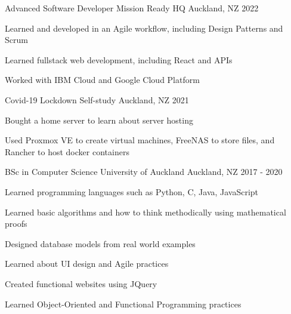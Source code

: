 

\begin{cventries}

  \cventry
    {Advanced Software Developer}
    {Mission Ready HQ}
    {Auckland, NZ}
    {2022}
    {
      \begin{cvitems}
        \item {Learned and developed in an Agile workflow, including Design Patterns and Scrum}
        \item {Learned fullstack web development, including React and APIs}
        \item {Worked with IBM Cloud and Google Cloud Platform}
      \end{cvitems}
    }

  \cventry
    {Covid-19 Lockdown}
    {Self-study}
    {Auckland, NZ}
    {2021}
    {
      \begin{cvitems}
        \item {Bought a home server to learn about server hosting}
        \item {Used Proxmox VE to create virtual machines, FreeNAS to store files, and Rancher to host docker containers}
      \end{cvitems}
    }

  \cventry
    {BSc in Computer Science} %
    {University of Auckland} %
    {Auckland, NZ} %
    {2017 - 2020} %
    {
      \begin{cvitems} %
        \item {Learned programming languages such as Python, C, Java, JavaScript}
        \item {Learned basic algorithms and how to think methodically using mathematical proofs}
        \item {Designed database models from real world examples}
        \item {Learned about UI design and Agile practices}
        \item {Created functional websites using JQuery}
        \item {Learned Object-Oriented and Functional Programming practices}
      \end{cvitems}
    }

\end{cventries}
